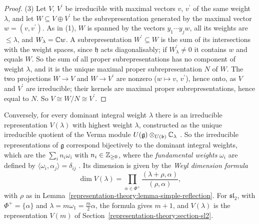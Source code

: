 \begin{proof}
(3) Let $V$, $V^{\prime}$ be irreducible with maximal vectors $v$, $v^{\prime}$ of the same weight $\lambda$, and let $W \subseteq V \oplus V^{\prime}$ be the subrepresentation generated by
the maximal vector $w = (v, v^{\prime})$. As in (1), $W$ is spanned by the vectors $y_1\cdots y_jw$, all its weights are $\leq \lambda$, and $W_\lambda = \mathbb{C} w$. A subrepresentation
$W^{\prime} \subseteq W$ is the sum of its intersections with the weight spaces, since $\mathfrak{h}$ acts diagonalisably; if $W^{\prime}_\lambda \neq 0$ it contains $w$ and equals $W$. So
the sum of all proper subrepresentations has no component of weight $\lambda$, and it is the unique maximal proper subrepresentation $N$ of $W$. The two projections $W \to V$ and
$W \to V^{\prime}$ are nonzero ($w \mapsto v$, $v^{\prime}$), hence onto, as $V$ and $V^{\prime}$ are irreducible; their kernels are maximal proper subrepresentations, hence equal to $N$.
So $V \cong W/N \cong V^{\prime}$.
\end{proof}

\begin{remark}\label{representation-theory:remark-weyl-character}
Conversely, for every dominant integral weight $\lambda$ there is an irreducible representation $V(\lambda)$ with highest weight $\lambda$, constructed as the unique irreducible quotient of the
Verma module $U(\mathfrak{g}) \otimes_{U(\mathfrak{b})}\mathbb{C}_\lambda$ \cite[Section 21]{humphreys-lie}. So the irreducible representations of $\mathfrak{g}$ correspond bijectively to the
dominant integral weights, which are the $\sum_in_i\omega_i$ with $n_i \in \mathbb{Z}_{\geq 0}$, where the \emph{fundamental weights} $\omega_i$ are defined by $\langle\omega_i, \alpha_j\rangle =
\delta_{ij}$ \cite[Section 13]{humphreys-lie}. Its dimension is given by the \emph{Weyl dimension formula} \cite[Section 24.3]{humphreys-lie}
\[
\dim V(\lambda) = \prod_{\alpha \in \Phi^+}\frac{(\lambda + \rho, \alpha)}{(\rho, \alpha)},
\]
with $\rho$ as in Lemma~\ref{representation-theory:lemma-simple-reflection}. For $\mathfrak{sl}_2$, with $\Phi^+ = \{\alpha\}$ and $\lambda = m\omega_1 = \frac m2\alpha$, the formula gives
$m + 1$, and $V(\lambda)$ is the representation $V(m)$ of Section~\ref{representation-theory:section-sl2}.
\end{remark}

